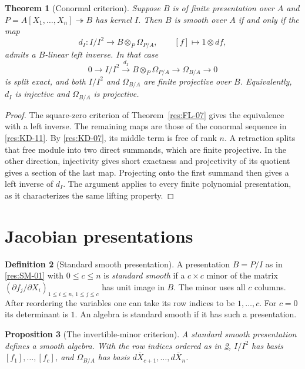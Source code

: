 \documentclass[11pt,oneside,openany]{book}
\newtheorem{theorem}{Theorem}[chapter]
\newtheorem{proposition}[theorem]{Proposition}
\theoremstyle{definition}
\newtheorem{definition}[theorem]{Definition}
\theoremstyle{remark}
\begin{document}
\begin{theorem}[Conormal criterion]
\label{res:SM-02}
Suppose $B$ is of finite presentation over $A$ and
$P=A[X_1,\ldots,X_n]\twoheadrightarrow B$ has kernel $I$.
Then $B$ is smooth over $A$ if and only if the map
\[
  d_I\colon I/I^2\longrightarrow B\otimes_P\Omega_{P/A},
  \qquad [f]\longmapsto 1\otimes df ,
\]
admits a $B$-linear left inverse. In that case
\[
  0\longrightarrow I/I^2\xrightarrow{d_I}
  B\otimes_P\Omega_{P/A}\longrightarrow\Omega_{B/A}
  \longrightarrow0
\]
is split exact, and both $I/I^2$ and $\Omega_{B/A}$ are finite
projective over $B$. Equivalently, $d_I$ is injective and
$\Omega_{B/A}$ is projective.
\end{theorem}

\begin{proof}
The square-zero criterion of Theorem~\ref{res:FL-07} gives the
equivalence with a left inverse. The remaining maps are those of
the conormal sequence in \ref{res:KD-11}. By \ref{res:KD-07}, its
middle term is free of rank $n$. A retraction splits that free
module into two direct summands, which are finite projective. In
the other direction, injectivity gives short exactness and
projectivity of its quotient gives a section of the last map.
Projecting onto the first summand then gives a left inverse of
$d_I$. The argument applies to every finite polynomial
presentation, as it characterizes the same lifting property.
\end{proof}

\section{Jacobian presentations}

\begin{definition}[Standard smooth presentation]
\label{res:SM-03}
A presentation $B=P/I$ as in \ref{res:SM-01} with $0\le c\le n$
is \emph{standard smooth} if a $c\times c$ minor of the matrix
$(\partial f_j/\partial X_i)_{1\le i\le n,\,1\le j\le c}$
has unit image in $B$. The minor uses all $c$ columns. After
reordering the variables one can take its row indices to be
$1,\ldots,c$. For $c=0$ its determinant is $1$. An algebra is
standard smooth if it has such a presentation.
\end{definition}

\begin{proposition}[The invertible-minor criterion]
\label{res:SM-04}
A standard smooth presentation defines a smooth algebra.
With the row indices ordered as in \ref{res:SM-03}, $I/I^2$
has basis $[f_1],\ldots,[f_c]$, and $\Omega_{B/A}$ has basis
$d\overline X_{c+1},\ldots,d\overline X_n$.
\end{proposition}
\end{document}
